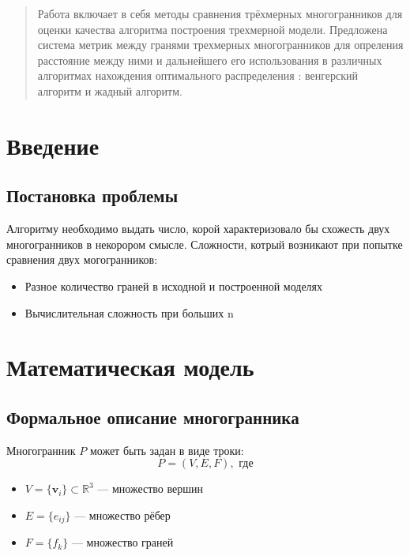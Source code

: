 \documentclass[a4paper,14pt]{extarticle}
\begin{document}
\maketitle

\begin{abstract}
Работа включает в себя методы сравнения трёхмерных многогранников для оценки качества алгоритма построения трехмерной модели.
Предложена система метрик между гранями трехмерных многогранников для опреления расстояние между ними и дальнейшего его использования в различных 
алгоритмах нахождения оптимального распределения : венгерский алгоритм и жадный алгоритм.
\end{abstract}

\section{Введение}

\subsection{Постановка проблемы}
Алгоритму необходимо выдать число, корой характеризовало бы схожесть двух многогранников в некорором смысле.
Сложности, котрый возникают при попытке сравнения двух могогранников:
\begin{itemize}
    \item Разное количество граней в исходной и построенной моделях
    \item Вычислительная сложность при больших n
\end{itemize}

\section{Математическая модель}
\subsection{Формальное описание многогранника}
Многогранник $P$ может быть задан в виде троки:
\begin{equation}
P = (V, E, F), \text{ где}
\end{equation}
\begin{itemize}
    \item $V = \{\mathbf{v}_i\} \subset \mathbb{R}^3$ — множество вершин
    \item $E = \{e_{ij}\}$ — множество рёбер
    \item $F = \{f_k\}$ — множество граней
\end{itemize}
\end{document}

